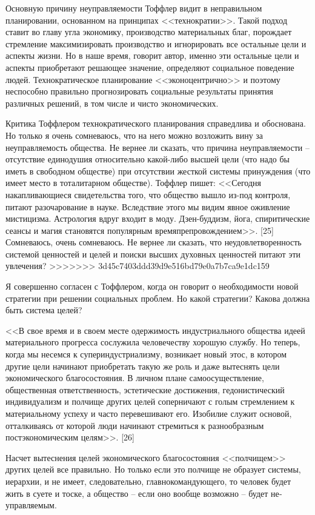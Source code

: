 \documentclass{book}
\begin{document}
{Основную причину неуправляемости Тоффлер видит в непра­вильном планировании, основанном на принципах <<технократии>>. Такой подход ставит во главу угла экономику, произ­водство материальных благ, порождает стремление максимизи­ровать производство и игнорировать все остальные цели и ас­пекты жизни. Но в наше время, говорит автор, именно эти остальные цели и аспекты приобретают решающее значение, опре­деляют социальное поведение людей. Технократическое плани­рование <<эконоцентрично>> и поэтому неспособно правильно прогнозировать социальные результаты принятия различных ре­шений, в том числе и чисто экономических.

Критика Тоффлером технократического планирования спра­ведлива и обоснована. Но только я очень сомневаюсь, что на не­го можно возложить вину за неуправляемость общества. Не вер­нее ли сказать, что причина неуправляемости -- отсутствие еди­нодушия относительно какой-либо высшей цели (что надо бы иметь в свободном обществе) при отсутствии жесткой систе­мы принуждения (что имеет место в тоталитарном обществе). Тоффлер пишет: <<Сегодня накапливающиеся свидетельства того, что общество вышло из-под контроля, питают разочаро­вание в науке. Вследствие этого мы видим явное оживление мистицизма. Астрология вдруг входит в моду. Дзен-буддизм, йога, спиритические сеансы и магия становятся популярным времяпрепровождением>>. [25] Сомневаюсь, очень сомневаюсь. Не вернее ли сказать, что неудовлетворенность системой ценно­стей и целей и поиски высших духовных ценностей питают эти увлечения?
>>>>>>> 3d45c7403ddd39d9e516bd79e0a7b7ca9e1dc159

Я совершенно согласен с Тоффлером, когда он говорит о необходимости новой стратегии при решении социальных проб­лем. Но какой стратегии? Какова должна быть система целей?

<<В свое время и в своем месте одержимость индустриально­го общества идеей материального прогресса сослужила челове­честву хорошую службу. Но теперь, когда мы несемся к супер­индустриализму, возникает новый этос, в котором другие це­ли начинают приобретать такую же роль и даже вытеснять це­ли экономического благосостояния. В личном плане самоосу­ществление, общественная ответственность, эстетические дости­жения, гедонистический индивидуализм и полчище других це­лей соперничают с голым стремлением к материальному успе­ху и часто перевешивают его. Изобилие служит основой, оттал­киваясь от которой люди начинают стремиться к разнообраз­ным постэкономическим целям>>. [26]

Насчет вытеснения целей экономического благосостояния <<полчищем>> других целей все правильно. Но только если это полчище не образует системы, иерархии,  и не имеет, следовательно, главнокомандующего, то человек будет жить в суете и тоске, а общество -- если оно вообще возможно -- будет не­управляемым.

}
\end{document}
